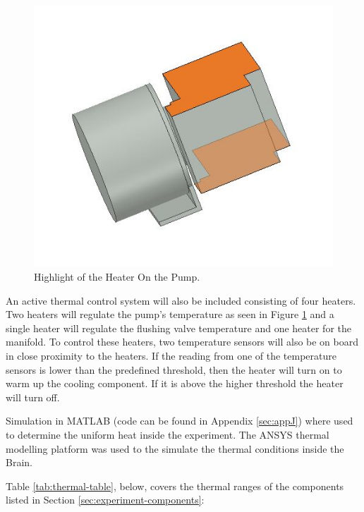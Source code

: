 \documentclass[a4paper,12pt,twoside]{article}
\begin{document}
\begin{figure}[H]
    \centering
    \includegraphics[width=0.5\linewidth]{4-experiment-design/img/Thermal/higlighted-heater-pump.JPG}
    \caption{Highlight of the Heater On the Pump.}
    \label{fig:highlight-heater-on-pump}
\end{figure}

An active thermal control system will also be included consisting of four heaters. Two heaters will regulate the pump's temperature as seen in Figure \ref{fig:highlight-heater-on-pump} and a single heater will regulate the flushing valve temperature and one heater for the manifold. To control these heaters, two temperature sensors will also be on board in close proximity to the heaters. If the reading from one of the temperature sensors is lower than the predefined threshold, then the heater will turn on to warm up the cooling component. If it is above the higher threshold the heater will turn off.

Simulation in MATLAB (code can be found in Appendix \ref{sec:appJ}) where used to determine the uniform heat inside the experiment. The ANSYS thermal modelling platform was used to the simulate the thermal conditions inside the Brain.

Table {\ref{tab:thermal-table}}, below, covers the thermal ranges of the components listed in Section \ref{sec:experiment-components}:



\end{document}
